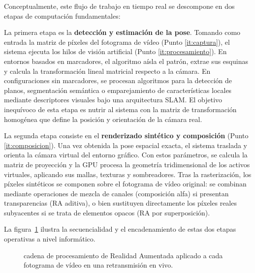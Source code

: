 Conceptualmente, este flujo de trabajo en tiempo real se descompone en dos etapas de computación fundamentales:

La primera etapa es la \textbf{detección y estimación de la pose}. Tomando como entrada la matriz de píxeles del fotograma de vídeo (Punto \ref{it:captura}), el sistema ejecuta los hilos de visión artificial (Punto \ref{it:procesamiento}). En entornos basados en marcadores, el algoritmo aísla el patrón, extrae sus esquinas y calcula la transformación lineal matricial respecto a la cámara. En configuraciones sin marcadores, se procesan algoritmos para la detección de planos, segmentación semántica o emparejamiento de características locales mediante descriptores visuales bajo una arquitectura SLAM. El objetivo inequívoco de esta etapa es nutrir al sistema con la matriz de transformación homogénea que define la posición y orientación de la cámara real.

La segunda etapa consiste en el \textbf{renderizado sintético y composición} (Punto \ref{it:composicion}). Una vez obtenida la pose espacial exacta, el sistema traslada y orienta la cámara virtual del entorno gráfico. Con estos parámetros, se calcula la matriz de proyección y la GPU procesa la geometría tridimensional de los activos virtuales, aplicando sus mallas, texturas y sombreadores. Tras la rasterización, los píxeles sintéticos se componen sobre el fotograma de vídeo original: se combinan mediante operaciones de mezcla de canales (composición alfa) si presentan transparencias (RA aditiva), o bien sustituyen directamente los píxeles reales subyacentes si se trata de elementos opacos (RA por superposición).

La figura~\ref{fig:pipeline-ra} ilustra la secuencialidad y el encadenamiento de estas dos etapas operativas a nivel informático.

\begin{figure}[H]
\centering
{}
\caption{cadena de procesamiento de Realidad Aumentada aplicado a cada fotograma de vídeo en una retransmisión en vivo.}
\label{fig:pipeline-ra}
\end{figure}


